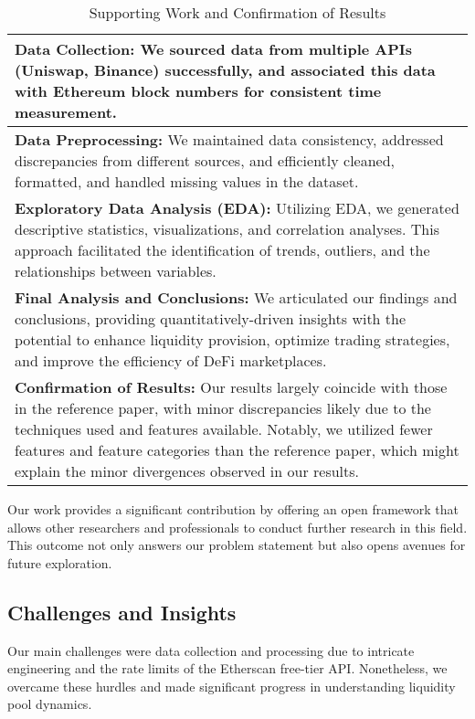 \documentclass{article}
\begin{document}
  \begin{table}[htbp]
  \centering
  \small
  \begin{tabularx}{\linewidth}{|>{\raggedright\arraybackslash}X|}
  \hline
  \textbf{Data Collection:} We sourced data from multiple APIs (Uniswap, Binance) successfully, and associated this data with Ethereum block numbers for consistent time measurement. \\
  \hline
  \textbf{Data Preprocessing:} We maintained data consistency, addressed discrepancies from different sources, and efficiently cleaned, formatted, and handled missing values in the dataset. \\
  \hline
  \textbf{Exploratory Data Analysis (EDA):} Utilizing EDA, we generated descriptive statistics, visualizations, and correlation analyses. This approach facilitated the identification of trends, outliers, and the relationships between variables. \\
  \hline
  \textbf{Final Analysis and Conclusions:} We articulated our findings and conclusions, providing quantitatively-driven insights with the potential to enhance liquidity provision, optimize trading strategies, and improve the efficiency of DeFi marketplaces. \\
  \hline
  \textbf{Confirmation of Results:} Our results largely coincide with those in the reference paper, with minor discrepancies likely due to the techniques used and features available. Notably, we utilized fewer features and feature categories than the reference paper, which might explain the minor divergences observed in our results\cite{Miori2023}. \\
  \hline
  \end{tabularx}
  \caption{Supporting Work and Confirmation of Results}
  \label{fig:approach-accomplishments}
  \end{table}

Our work provides a significant contribution by offering an open framework that allows other researchers and professionals to conduct further research in this field. This outcome not only answers our problem statement but also opens avenues for future exploration\cite{Miori2022}.

\subsection{\textbf{Challenges and Insights}}

Our main challenges were data collection and processing due to intricate engineering and the rate limits of the Etherscan free-tier API\cite{etherscanAPI}. Nonetheless, we overcame these hurdles and made significant progress in understanding liquidity pool dynamics\cite{Miori2022,Aigner2021,Miori2023}.
\end{document}
